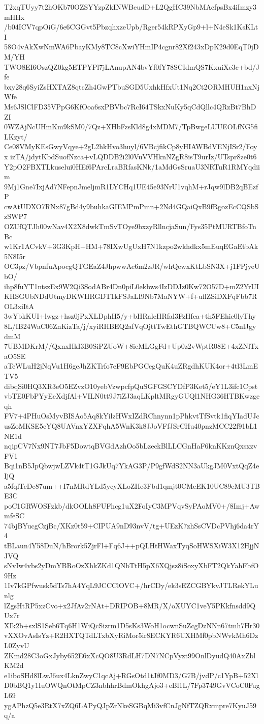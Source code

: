 T2xqTUyy7t2hOKb70OZSYYzpZkINWBeudD+L2QgHC39NbMAcfpsBx4iImzy3mHHx
/b04ICV7qpOiG/6e6CGGvt5PbzqhxzeUpb/Rger54kRPXyGp9+l+N4eSk1KsKLtI
58O4vAkXwNmWA6PbayKMy8TC8cXwiYHmIP4cgnr82Xf243xDpK29d0EqT0jDM/YH
TWO8EI6OszQZ0kg5ETPYPl7jLAnupAN4bvYf0fY78SCIdmQS7KxuiXe3c+bd/Jfe
bxy28q6SyiZsHXTAZ8qtcZh4GwPTbuSGD5UxhkHfxUt1Nq2Ct2ORMHUH1nxNjWfe
Ms6JSlClFD35VPpG6KfOoa6sxPBVbc7RcI64TSkxNuKy5qCdQllc4QRzBt7BhDZI
0WZAjNcUHmKm9kSM0/7Qz+XHbFzsKld8g4xMDM7/TpBwgeLUUEOLfNG5fiLKzyt/
Ce08VMyKEsGwyVqye+2gL2hkHvo3huyl/6VBcjfikCp8yHIAWBdVENjISr2/Foyx
izTA/jdytKbdSuofNzca+vLQDDB2i2l0VuVVHknNZgR8isT9urIz/UTspr8ze0t6
Y2pO2FBXTLkuselui0HEf6PArcLraBRfasKNk/1aMdGsSruaU3NRTuR1RMYqdiim
9Mj1Gne7IxjAd7NFepnJmeljmR1LYCHq1UE45e93NrU1vqhM+rJqw9lDB2qBEzfP
cwAtUDXO7RNx87gBd4y9buhkaGIEMPmPmn+2Nd4GQaiQxB9fRgozEcCQSbSzSWP7
OZUfQTJh00wNav4X2X8dwkTmSvTOye9bxzyRllncjaSun/Fys35PtMURTBfoTnBc
w1Kr1ACvkV+3G3KpH+HM+78IXwUgUxH7N1kzpo2wkhdkx5mEuqEGaEtbAk5N8I5r
OC3pz/VbpnfuApocgQTGEaZ4JhpwwAe6m2zJR/whQewxKtLbSN3X+j1FPjyeUbO/
ihp8fuYT1ntszEx9W2Qi3SodABr4Dn0piL0ekbws4IzDDJz0Kw72O57D+mZ2YrUI
KHSGUbNDdUtmyDKWHRGDT1kFSJaLI9Nb7MaNYW+f+uflZSiDXFqFbb7ROL3xiItA
3wYbkKUI+lwgz+hsz0jPxXLDphH5/y+bHRaleHRfal3FzHfea+th5FEhie0lyThy
8L/IB24WaC06ZnKizTa/j/xyiRHBEQ2afVqOjttTwEthGTBQWCUw8+C5nlJgydmM
7UBMDKrM//QxnxHkI3B0SiPZUoW+8ieMLGgFd+Up0z2vWptR08E+4xZNlTxaO5SE
aTeWLuH2jNqVu1H6geJhZKTrfo7eF9EbPGCegQuK4uZRgdhKUK4or+4tl3LmETV5
dibqSi0HQ3XR3eO5EZvzO10yebVzwpcfpQuSGFGSCYDfP3Ket5/eY1L3ifc1Cpst
vbTE0FbPYyEeXdjfAl+VILN0tt9J7iZJ3aqLKpltMRgyGUQl1NHG36HTBKwzgeqh
FV7+4PHuOsMyvBISAo5Aq8kYilzHWxIZdRChnynn1pPhkvtTfSvtk1fiqYIadUJc
usZoMKSE5cYQ8UAVnxYZXFqhA5WnK3k8JJoVFfJSrCHu40pnzMCC22f91bL1NE1d
nqipCV7Nx9NT7JbF5DowtqBVGdAzhOo5bLzeckBlLLCGnHaF6knKKznQxsxzvFV1
Bqi1nB5JpQbwjwLZVk4tT1GJkUq7YkAG3P/P9gfWdS2NN3aUkgJM0VxtQqZ4eIjQ
a5fqlTcDe87um++I7nMRdYLd5ycyXLoZHe3Fbd1qmjt0CMeEK10UC89eMU3TBE3C
poC1GRWOSFzkb/dkOOLh8FUFhcg1uX2FoIyC3MPVqvSyPAoMV0+/8Imj+AwmfeSC
74bjBYucgCzjBc/XKz0t59+CIPUA9nD93nvV/tg+UEzK7zhSsCVDcPVhj6da4rY4
tBLaun4Y58DuN/hBrork5ZjrFl+Fq6J++pQLHtHWaxTyqSoHWSXiW3X12HjjNJVQ
sNvIw4vbs2yDmYBRoOzXhkZKd1QNbTtH5pX6XQjsz8iSoxyXbFT2QkYahFbfO9Hz
1Iv7kGPfwusk5dTs7hA4YqL9JCCClOVC+/hrCDy/ek3sEZCGBYkvJTLRekYLunlg
lZgsHtRP5xzCvo+x2JfAv2rNAt+DRIPOB+8MR/X/oXUYC1veY5PKkfnsdd9QUx7r
XIk2b+sxlS1Seb6Tq6H1WiQcSizrm1D5sKs3WoH1ocwnSuZcgDzNNn67tmh7Hr30
vXXOvAsIsYz+R2HXTQTdLTxbXyRiMor5ir8ECKYR6UXHMf0pbNWvkMh6DzL0ZyvU
ZKmd28C3oGxJyby652E6xXcQO8U3RdLH7DN7NCpVyzt99OnlDyudQ40AxZblKM2d
e1iboSHd8lLwJ6ux4LknZwyC1qcAj+RGsOtd1tJf0MD3/G7B/jvdP/c1YpB+52Xl
D0bBQ1y1IuOWQnOtMpCZ3nbhhrBdmOkhgAjo3+eBl1L/7Fp3749GvVCoC0FugL69
ygAPhzQ5e3RtX7xZQ6LAPyQJpZrNkeSGBqMi3vfCnJgNfTZQRxmpre7KyuJ59q/a
